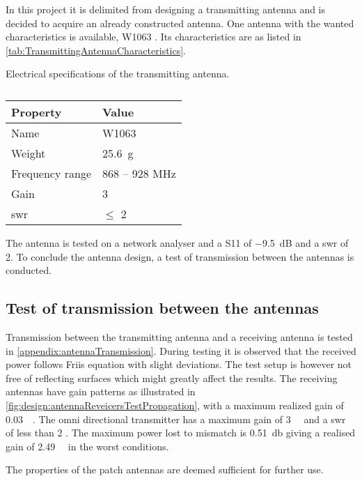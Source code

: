 In this project it is delimited from designing a transmitting antenna and is decided to acquire an already constructed antenna. One antenna with the wanted characteristics is available, W1063 \citep{datasheet:isotropicDipole}. Its characteristics are as listed in \autoref{tab:TransmittingAntennaCharacteristics}.
\begin{table}[h!]
	\centering
	\caption{Electrical specifications of the transmitting antenna.}\label{tab:TransmittingAntennaCharacteristics}
	\begin{tabular}{ll}
		\textbf{Property} & \textbf{Value} \\ \toprule \rowcolor{lightGrey}
		Name 		& W1063 \\
		Weight	& \SI{25.6}{\gram} \\ \rowcolor{lightGrey}
		Frequency range & 868 – 928 \si{\mega\hertz} \\ 
		Gain & \SI{3}{\deci\beli}\\ \rowcolor{lightGrey}
		\gls{swr} & $\leq$ 2 \\ 
	\end{tabular}
	\caption*{\citep{datasheet:isotropicDipole}}
\end{table}

The antenna is tested on a network analyser and a S11 of \SI{-9.5}{\deci\bel} and a \gls{swr} of \SI{2}{}. To conclude the antenna design, a test of transmission between the antennas is conducted.

\subsection{Test of transmission between the antennas}\label{sec:AntennaTest}
Transmission between the transmitting antenna and a receiving antenna is tested in \autoref{appendix:antennaTransmission}. During testing it is observed that the received power follows Friis equation with slight deviations. The test setup is however not free of reflecting surfaces which might greatly affect the results. The receiving antennas have gain patterns as illustrated in \autoref{fig:design:antennaReveicersTestPropagation}, with a maximum realized gain of \SI{0.03}{\deci\beli}. The omni directional transmitter has a maximum gain of \SI{3}{\deci\beli} and a \gls{swr} of less than 2 \citep{datasheet:isotropicDipole}. The maximum power lost to mismatch is \SI{0,51}{\decibel} giving a realised gain of \SI{2,49}{\deci\beli} in the worst conditions. 

The properties of the patch antennas are deemed sufficient for further use.